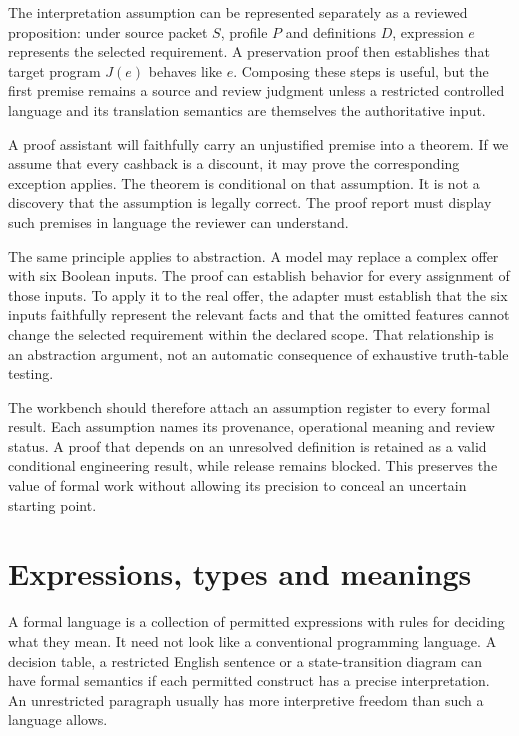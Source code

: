 \documentclass[12pt,a4paper,oneside,openany]{book}
\begin{document}
The interpretation assumption can be represented separately as a reviewed
proposition: under source packet $S$, profile $P$ and definitions $D$, expression
$e$ represents the selected requirement. A preservation proof then establishes
that target program $J(e)$ behaves like $e$. Composing these steps is useful, but
the first premise remains a source and review judgment unless a restricted
controlled language and its translation semantics are themselves the authoritative
input.

A proof assistant will faithfully carry an unjustified premise into a theorem.
If we assume that every cashback is a discount, it may prove the corresponding
exception applies. The theorem is conditional on that assumption. It is not a
discovery that the assumption is legally correct. The proof report must display
such premises in language the reviewer can understand.

The same principle applies to abstraction. A model may replace a complex offer
with six Boolean inputs. The proof can establish behavior for every assignment
of those inputs. To apply it to the real offer, the adapter must establish that
the six inputs faithfully represent the relevant facts and that the omitted
features cannot change the selected requirement within the declared scope.
That relationship is an abstraction argument, not an automatic consequence of
exhaustive truth-table testing.

The workbench should therefore attach an assumption register to every formal
result. Each assumption names its provenance, operational meaning and review
status. A proof that depends on an unresolved definition is retained as a valid
conditional engineering result, while release remains blocked. This preserves
the value of formal work without allowing its precision to conceal an uncertain
starting point.

\section{Expressions, types and meanings}
\label{sec:proof-language}
A formal language is a collection of permitted expressions with rules for
deciding what they mean. It need not look like a conventional programming
language. A decision table, a restricted English sentence or a state-transition
diagram can have formal semantics if each permitted construct has a precise
interpretation. An unrestricted paragraph usually has more interpretive freedom
than such a language allows.
\end{document}
